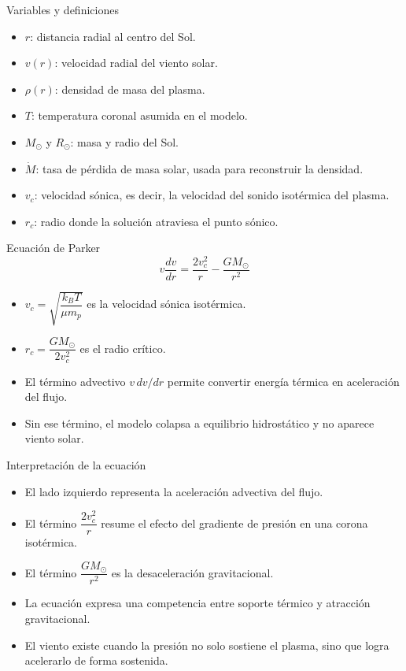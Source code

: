 \documentclass[aspectratio=169]{beamer}
\begin{document}
\begin{frame}{Variables y definiciones}
  \begin{itemize}
    \item $r$: distancia radial al centro del Sol.
    \item $v(r)$: velocidad radial del viento solar.
    \item $\rho(r)$: densidad de masa del plasma.
    \item $T$: temperatura coronal asumida en el modelo.
    \item $M_\odot$ y $R_\odot$: masa y radio del Sol.
    \item $\dot{M}$: tasa de p\'erdida de masa solar, usada para reconstruir la densidad.
    \item $v_c$: velocidad s\'onica, es decir, la velocidad del sonido isot\'ermica del plasma.
    \item $r_c$: radio donde la soluci\'on atraviesa el punto s\'onico.
  \end{itemize}
\end{frame}

\begin{frame}{Ecuaci\'on de Parker}
  \[
    v \frac{dv}{dr} = \frac{2 v_c^2}{r} - \frac{G M_\odot}{r^2}
  \]

  \vspace{0.5em}
  \begin{itemize}
    \item $v_c = \sqrt{\dfrac{k_B T}{\mu m_p}}$ es la velocidad s\'onica isot\'ermica.
    \item $r_c = \dfrac{G M_\odot}{2 v_c^2}$ es el radio cr\'itico.
    \item El t\'ermino advectivo $v\,dv/dr$ permite convertir energ\'ia t\'ermica en aceleraci\'on del flujo.
    \item Sin ese t\'ermino, el modelo colapsa a equilibrio hidrost\'atico y no aparece viento solar.
  \end{itemize}
\end{frame}

\begin{frame}{Interpretaci\'on de la ecuaci\'on}
  \begin{itemize}
    \item El lado izquierdo representa la aceleraci\'on advectiva del flujo.
    \item El t\'ermino $\dfrac{2v_c^2}{r}$ resume el efecto del gradiente de presi\'on en una corona isot\'ermica.
    \item El t\'ermino $\dfrac{GM_\odot}{r^2}$ es la desaceleraci\'on gravitacional.
    \item La ecuaci\'on expresa una competencia entre soporte t\'ermico y atracci\'on gravitacional.
    \item El viento existe cuando la presi\'on no solo sostiene el plasma, sino que logra acelerarlo de forma sostenida.
  \end{itemize}
\end{frame}
\end{document}
